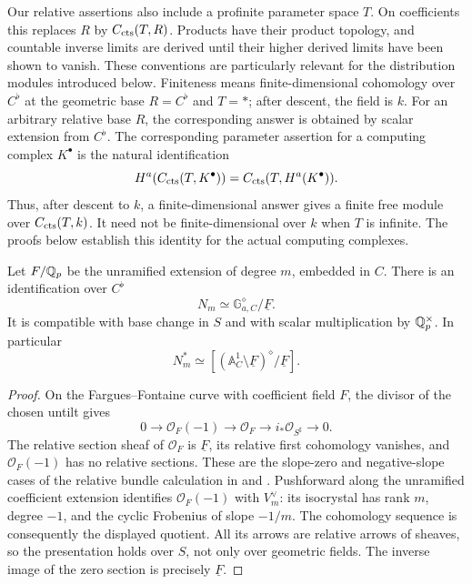 Our relative assertions also include a profinite parameter space $T$.
On coefficients this replaces $R$ by $C_{\mathrm{cts}}(T,R)$.  Products have
their product topology, and countable inverse limits are derived until
their higher derived limits have been shown to vanish.  These
conventions are particularly relevant for the distribution modules
introduced below.
Finiteness means finite-dimensional cohomology over $C^\flat$ at the
geometric base $R=C^\flat$ and $T=*$; after descent, the field is $k$.
For an arbitrary relative base $R$, the corresponding answer is obtained
by scalar extension from $C^\flat$.
The corresponding parameter assertion for a computing complex
$K^\bullet$ is the natural identification
\[
 H^a(C_{\mathrm{cts}}(T,K^\bullet))
       =C_{\mathrm{cts}}(T,H^a(K^\bullet)).
\]
Thus, after descent to $k$, a finite-dimensional answer gives a
finite free module over $C_{\mathrm{cts}}(T,k)$.  It need not be
finite-dimensional over $k$ when $T$ is infinite.  The proofs
below establish this identity for the actual computing complexes.

\begin{lemma}\label{h3:ana:relative-bc}
Let $F/\mathbb Q_p$ be the unramified extension of degree $m$, embedded in $C$.
There is an identification over $C^\flat$
\[
 N_m\simeq \mathbb G_{a,C}^{\diamond}/\underline F.
\]
It is compatible with base change in $S$ and with scalar multiplication
by $\mathbb Q_p^\times$.  In particular
\[
 N_m^*\simeq
 [(\mathbb A^1_C\setminus\underline F)^{\diamond}/\underline F].
\]
\end{lemma}
\begin{proof}
On the Fargues--Fontaine curve with coefficient field $F$, the divisor
of the chosen untilt gives
\[
 0\longrightarrow\mathcal O_F(-1)\longrightarrow\mathcal O_F
   \longrightarrow i_*\mathcal O_{S^\sharp}\longrightarrow0.
\]
The relative section sheaf of $\mathcal O_F$ is $\underline F$,
its relative first cohomology vanishes, and
$\mathcal O_F(-1)$ has no relative sections.  These are the
slope-zero and negative-slope cases of the relative bundle
calculation in  and \cite{FarguesFontaine,KedlayaLiu}. Pushforward along the
unramified coefficient extension identifies
$\mathcal O_F(-1)$ with $V_m^\vee$: its isocrystal has rank $m$,
degree $-1$, and the cyclic Frobenius of slope $-1/m$.
The cohomology sequence is consequently the displayed quotient.
All its arrows are relative arrows of sheaves, so the presentation
holds over $S$, not only over geometric fields.  The inverse image of
the zero section is precisely $\underline F$.
\end{proof}

